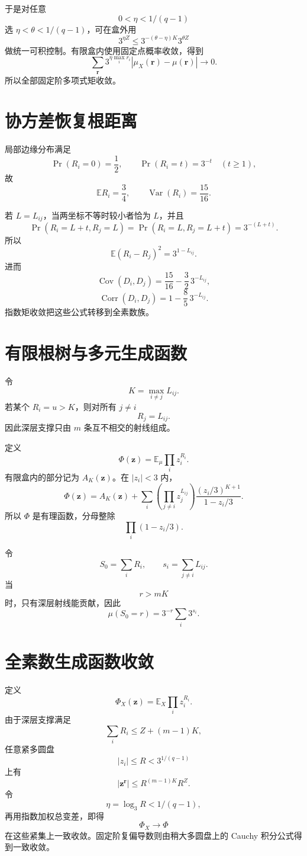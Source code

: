\documentclass[11pt,a4paper]{ctexart}
\begin{document}
于是对任意
\[
0<\eta<1/(q-1)
\]
选 \(\eta<\theta<1/(q-1)\)，可在盒外用
\[
3^{\eta Z}
\le
3^{-(\theta-\eta)K}3^{\theta Z}
\]
做统一可积控制。有限盒内使用固定点概率收敛，得到
\[
\boxed{
\sum_{\mathbf r}
3^{\eta\max_i r_i}
|\mu_X(\mathbf r)-\mu(\mathbf r)|
\to0.
}
\]
所以全部固定阶多项式矩收敛。

\section{协方差恢复根距离}
局部边缘分布满足
\[
\Pr(R_i=0)=\frac12,\qquad
\Pr(R_i=t)=3^{-t}\quad(t\ge1),
\]
故
\[
\mathbb ER_i=\frac34,\qquad
\operatorname{Var}(R_i)=\frac{15}{16}.
\]

若 \(L=L_{ij}\)，当两坐标不等时较小者恰为 \(L\)，并且
\[
\Pr(R_i=L+t,R_j=L)
=
\Pr(R_i=L,R_j=L+t)
=
3^{-(L+t)}.
\]
所以
\[
\boxed{
\mathbb E(R_i-R_j)^2
=
3^{1-L_{ij}}.
}
\]
进而
\[
\boxed{
\operatorname{Cov}(D_i,D_j)
=
\frac{15}{16}
-
\frac32\,3^{-L_{ij}},
}
\]
\[
\boxed{
\operatorname{Corr}(D_i,D_j)
=
1-\frac85\,3^{-L_{ij}}.
}
\]
指数矩收敛把这些公式转移到全素数族。

\section{有限根树与多元生成函数}
令
\[
K=\max_{i\ne j}L_{ij}.
\]
若某个 \(R_i=u>K\)，则对所有 \(j\ne i\)
\[
R_j=L_{ij}.
\]
因此深层支撑只由 \(m\) 条互不相交的射线组成。

定义
\[
\Phi(\mathbf z)=\mathbb E_\mu\prod_i z_i^{R_i}.
\]
有限盒内的部分记为 \(A_K(\mathbf z)\)。在 \(|z_i|<3\) 内，
\[
\boxed{
\Phi(\mathbf z)
=
A_K(\mathbf z)
+
\sum_i
\left(\prod_{j\ne i}z_j^{L_{ij}}\right)
\frac{(z_i/3)^{K+1}}{1-z_i/3}.
}
\]
所以 \(\Phi\) 是有理函数，分母整除
\[
\prod_i(1-z_i/3).
\]

令
\[
S_0=\sum_iR_i,\qquad
s_i=\sum_{j\ne i}L_{ij}.
\]
当
\[
r>mK
\]
时，只有深层射线能贡献，因此
\[
\boxed{
\mu(S_0=r)
=
3^{-r}\sum_i3^{s_i}.
}
\]

\section{全素数生成函数收敛}
定义
\[
\Phi_X(\mathbf z)=\mathbb E_X\prod_i z_i^{R_i}.
\]
由于深层支撑满足
\[
\sum_iR_i\le Z+(m-1)K,
\]
任意紧多圆盘
\[
|z_i|\le R<3^{1/(q-1)}
\]
上有
\[
|\mathbf z^{\mathbf r}|
\le
R^{(m-1)K}R^Z.
\]
令
\[
\eta=\log_3R<1/(q-1),
\]
再用指数加权总变差，即得
\[
\boxed{
\Phi_X\to\Phi
}
\]
在这些紧集上一致收敛。固定阶复偏导数则由稍大多圆盘上的 Cauchy 积分公式得到一致收敛。
\end{document}
